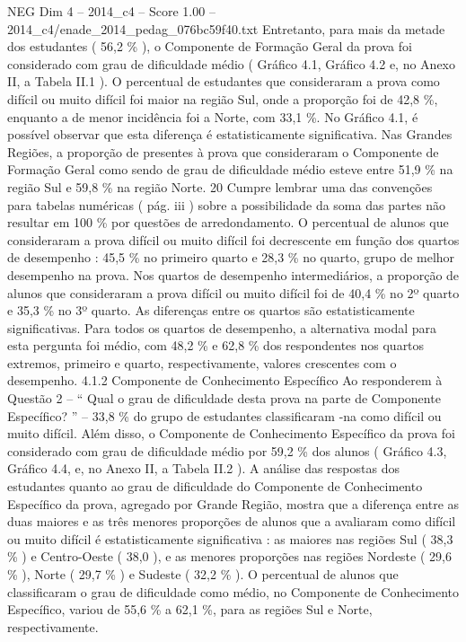\begin{textsample}{NEG Dim 4 – 2014\_c4 – Score 1.00 – 2014\_c4/enade\_2014\_pedag\_076bc59f40.txt}
Entretanto, para mais da metade dos estudantes ( 56,2 \% ), o Componente de Formação Geral da prova foi considerado com grau de dificuldade médio ( Gráfico 4.1, Gráfico 4.2 e, no Anexo II, a Tabela II.1 ).
O percentual de estudantes que consideraram a prova como difícil ou muito difícil foi maior na região Sul, onde a proporção foi de 42,8 \%, enquanto a de menor incidência foi a Norte, com 33,1 \%.
No Gráfico 4.1, é possível observar que esta diferença é estatisticamente significativa.
Nas Grandes Regiões, a proporção de presentes à prova que consideraram o Componente de Formação Geral como sendo de grau de dificuldade médio esteve entre 51,9 \% na região Sul e 59,8 \% na região Norte. 20 Cumpre lembrar uma das convenções para tabelas numéricas ( pág. iii ) sobre a possibilidade da soma das partes não resultar em 100 \% por questões de arredondamento.
O percentual de alunos que consideraram a prova difícil ou muito difícil foi decrescente em função dos quartos de desempenho : 45,5 \% no primeiro quarto e 28,3 \% no quarto, grupo de melhor desempenho na prova.
Nos quartos de desempenho intermediários, a proporção de alunos que consideraram a prova difícil ou muito difícil foi de 40,4 \% no 2º quarto e 35,3 \% no 3º quarto.
As diferenças entre os quartos são estatisticamente significativas.
Para todos os quartos de desempenho, a alternativa modal para esta pergunta foi médio, com 48,2 \% e 62,8 \% dos respondentes nos quartos extremos, primeiro e quarto, respectivamente, valores crescentes com o desempenho. 4.1.2 Componente de Conhecimento Específico Ao responderem à Questão 2 – “ Qual o grau de dificuldade desta prova na parte de Componente Específico? ” – 33,8 \% do grupo de estudantes classificaram -na como difícil ou muito difícil.
Além disso, o Componente de Conhecimento Específico da prova foi considerado com grau de dificuldade médio por 59,2 \% dos alunos ( Gráfico 4.3, Gráfico 4.4, e, no Anexo II, a Tabela II.2 ).
A análise das respostas dos estudantes quanto ao grau de dificuldade do Componente de Conhecimento Específico da prova, agregado por Grande Região, mostra que a diferença entre as duas maiores e as três menores proporções de alunos que a avaliaram como difícil ou muito difícil é estatisticamente significativa : as maiores nas regiões Sul ( 38,3 \% ) e Centro-Oeste ( 38,0 ), e as menores proporções nas regiões Nordeste ( 29,6 \% ), Norte ( 29,7 \% ) e Sudeste ( 32,2 \% ).
O percentual de alunos que classificaram o grau de dificuldade como médio, no Componente de Conhecimento Específico, variou de 55,6 \% a 62,1 \%, para as regiões Sul e Norte, respectivamente.

\end{textsample}
